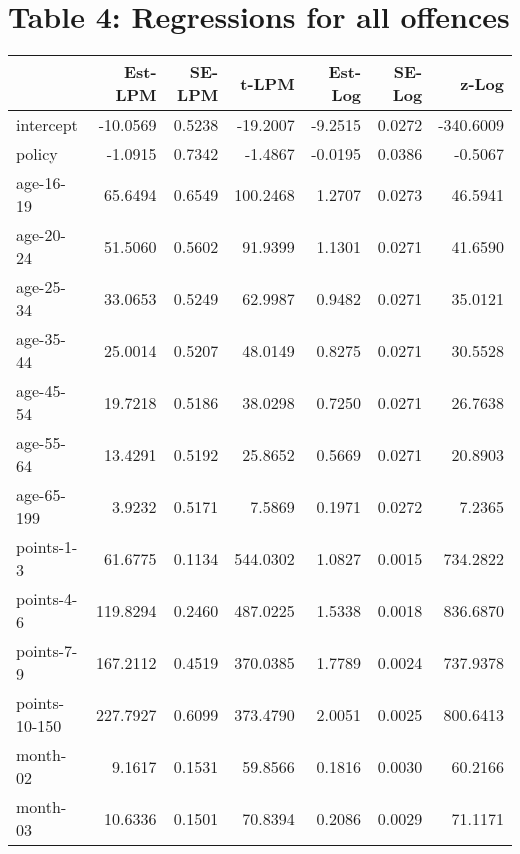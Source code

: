 \documentclass[10pt]{article}
\begin{document}
\clearpage
\pagebreak




\section{Table 4: Regressions for all offences}




\begin{table}[ht]
\centering
\begin{tabular}{lrrrrrr}
  \hline
 & Est-LPM & SE-LPM & t-LPM & Est-Log & SE-Log & z-Log \\ 
  \hline
intercept & -10.0569 & 0.5238 & -19.2007 & -9.2515 & 0.0272 & -340.6009 \\ 
  policy & -1.0915 & 0.7342 & -1.4867 & -0.0195 & 0.0386 & -0.5067 \\ 
  age-16-19 & 65.6494 & 0.6549 & 100.2468 & 1.2707 & 0.0273 & 46.5941 \\ 
  age-20-24 & 51.5060 & 0.5602 & 91.9399 & 1.1301 & 0.0271 & 41.6590 \\ 
  age-25-34 & 33.0653 & 0.5249 & 62.9987 & 0.9482 & 0.0271 & 35.0121 \\ 
  age-35-44 & 25.0014 & 0.5207 & 48.0149 & 0.8275 & 0.0271 & 30.5528 \\ 
  age-45-54 & 19.7218 & 0.5186 & 38.0298 & 0.7250 & 0.0271 & 26.7638 \\ 
  age-55-64 & 13.4291 & 0.5192 & 25.8652 & 0.5669 & 0.0271 & 20.8903 \\ 
  age-65-199 & 3.9232 & 0.5171 & 7.5869 & 0.1971 & 0.0272 & 7.2365 \\ 
  points-1-3 & 61.6775 & 0.1134 & 544.0302 & 1.0827 & 0.0015 & 734.2822 \\ 
  points-4-6 & 119.8294 & 0.2460 & 487.0225 & 1.5338 & 0.0018 & 836.6870 \\ 
  points-7-9 & 167.2112 & 0.4519 & 370.0385 & 1.7789 & 0.0024 & 737.9378 \\ 
  points-10-150 & 227.7927 & 0.6099 & 373.4790 & 2.0051 & 0.0025 & 800.6413 \\ 
  month-02 & 9.1617 & 0.1531 & 59.8566 & 0.1816 & 0.0030 & 60.2166 \\ 
  month-03 & 10.6336 & 0.1501 & 70.8394 & 0.2086 & 0.0029 & 71.1171 \\ 

\end{tabular}
\end{table}
\end{document}
